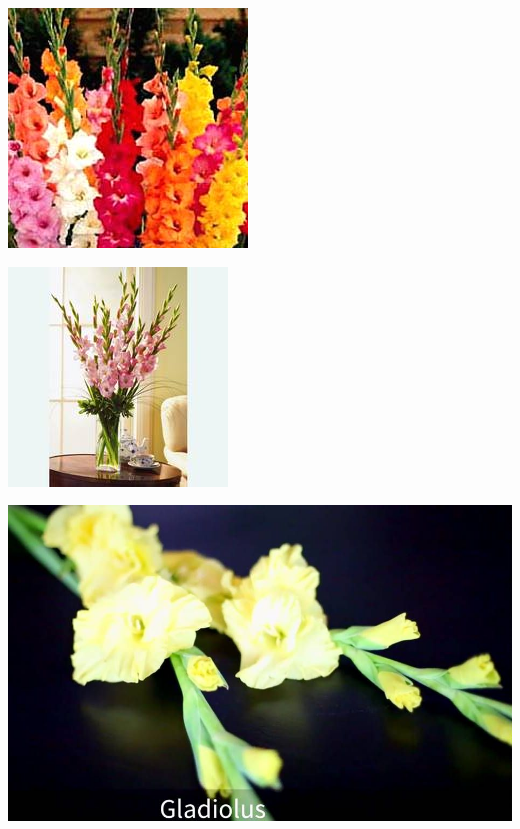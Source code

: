 \documentclass{article}
\begin{document}
\begin{center}
\includegraphics[width=0.9\textheight, angle=90]{../Gladiolous.jpg}
\end{center}
\newpage

\begin{center}
\includegraphics[width=0.9\textheight, angle=90]{../Gladiolous_Bouquet.jpg}
\end{center}
\newpage

\begin{center}
\includegraphics[width=0.9\textheight, angle=90]{../Gladiolus.jpg}
\end{center}
\newpage
\end{document}
